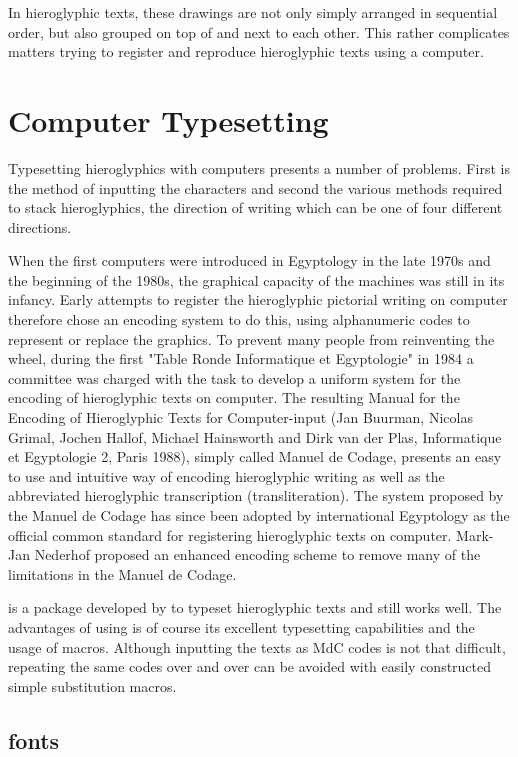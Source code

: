 In hieroglyphic texts, these drawings are not only simply arranged in sequential order, but also grouped on top of and next to each other. This rather complicates matters trying to register and reproduce hieroglyphic texts using a computer.

\section{Computer Typesetting}

Typesetting hieroglyphics with computers presents a number of problems. First is the method of inputting the characters and second the various methods required to stack hieroglyphics, the direction of writing which can be one of four different directions.

When the first computers were introduced in Egyptology in the late 1970s and the beginning of the 1980s, the graphical capacity of the machines was still in its infancy. Early attempts to register the hieroglyphic pictorial writing on computer therefore chose an encoding system to do this, using alphanumeric codes to represent or replace the graphics. To prevent many people from reinventing the wheel, during the first "Table Ronde Informatique et Egyptologie" in 1984 a committee was charged with the task to develop a uniform system for the encoding of hieroglyphic texts on computer. The resulting Manual for the Encoding of Hieroglyphic Texts for Computer-input (Jan Buurman, Nicolas Grimal, Jochen Hallof, Michael Hainsworth and Dirk van der Plas, Informatique et Egyptologie 2, Paris 1988), simply called Manuel de Codage, presents an easy to use and intuitive way of encoding hieroglyphic writing as well as the abbreviated hieroglyphic transcription (transliteration). The system proposed by the Manuel de Codage has since been adopted by international Egyptology as the official common standard for registering hieroglyphic texts on computer. Mark-Jan Nederhof proposed an enhanced encoding scheme to remove many of the limitations in the Manuel de Codage.

 is a \latexe package developed by to typeset hieroglyphic texts and still works well. The advantages of using \tex is of course its excellent typesetting capabilities and the usage of macros. Although inputting the texts as MdC codes is not that difficult, repeating the same codes over and over can be avoided with easily constructed simple substitution macros. 

\subsection{fonts}

